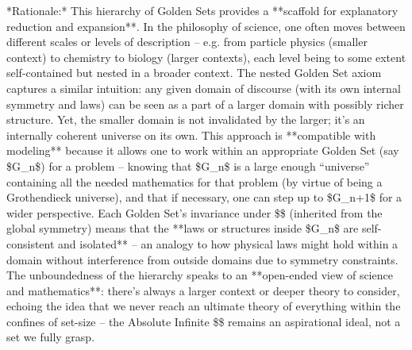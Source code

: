 \documentclass[11pt]{article}
\begin{document}
    *Rationale:* This hierarchy of Golden Sets provides a **scaffold for explanatory reduction and expansion**. In the philosophy of science, one often moves between different scales or levels of description – e.g. from particle physics (smaller context) to chemistry to biology (larger contexts), each level being to some extent self-contained but nested in a broader context. The nested Golden Set axiom captures a similar intuition: any given domain of discourse (with its own internal symmetry and laws) can be seen as a part of a larger domain with possibly richer structure. Yet, the smaller domain is not invalidated by the larger; it’s an internally coherent universe on its own. This approach is **compatible with modeling** because it allows one to work within an appropriate Golden Set (say \$G\_n\$) for a problem – knowing that \$G\_n\$ is a large enough “universe” containing all the needed mathematics for that problem (by virtue of being a Grothendieck universe), and that if necessary, one can step up to \$G\_{n+1}\$ for a wider perspective. Each Golden Set’s invariance under \$\Sym\$ (inherited from the global symmetry) means that the **laws or structures inside \$G\_n\$ are self-consistent and isolated** – an analogy to how physical laws might hold within a domain without interference from outside domains due to symmetry constraints. The unboundedness of the hierarchy speaks to an **open-ended view of science and mathematics**: there’s always a larger context or deeper theory to consider, echoing the idea that we never reach an ultimate theory of everything within the confines of set-size – the Absolute Infinite \$\infty\$ remains an aspirational ideal, not a set we fully grasp.
\end{document}
